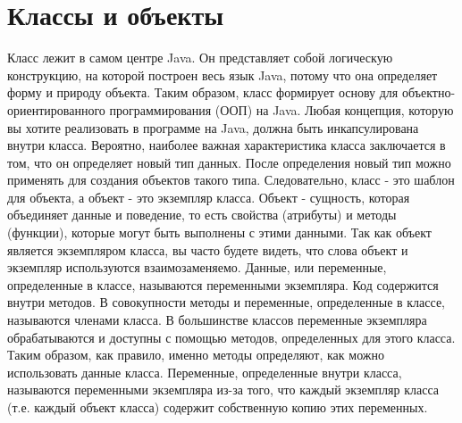 \section{Классы и объекты}
Класс лежит в самом центре Java. Он представляет собой логическую конструкцию, на которой построен весь язык Java, потому что она определяет форму и природу объекта. Таким образом, класс формирует основу для объектно-ориентированного программирования (ООП) на Java. Любая концепция, которую вы хотите реализовать в программе на Java, должна быть инкапсулирована внутри класса. Вероятно, наиболее важная характеристика класса заключается в том, что он определяет новый тип данных. После определения новый тип можно применять для создания объектов такого типа. Следовательно, класс - это шаблон для объекта, а объект - это экземпляр класса. Объект - сущность, которая объединяет данные и поведение, то есть свойства (атрибуты) и методы (функции), которые могут быть выполнены с этими данными. Так как объект является экземпляром класса, вы часто будете видеть, что слова объект и экземпляр используются взаимозаменяемо. Данные, или переменные, определенные в классе, называются переменными экземпляра. Код содержится внутри методов. В совокупности методы и переменные, определенные в классе, называются членами класса. В большинстве классов переменные экземпляра обрабатываются и доступны с помощью методов, определенных для этого класса. Таким образом, как правило, именно методы определяют, как можно использовать данные класса. Переменные, определенные внутри класса, называются переменными экземпляра из-за того, что каждый экземпляр класса (т.е. каждый объект класса) содержит собственную копию этих переменных. \\
